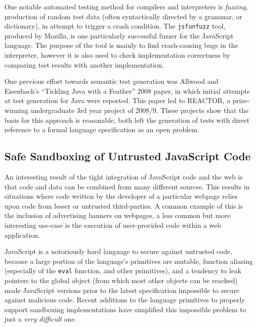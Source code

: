 \documentclass[a4paper]{article}
\begin{document}
One notable automated testing method for compilers and interpreters is
\emph{fuzzing}, production of random test data (often syntactically directed by
a grammar, or dictionary), in attempt to trigger a crash condition. The
\texttt{jsfunfuzz} tool, produced by Mozilla, is one particularly successful
fuzzer for the JavaScript language. The purpose of the tool is mainly to find
crash-causing bugs in the interpreter, however it is also used to check
implementation correctness by comparing test results with another implementation.

One previous effort towards semantic test generation was Allwood and Eisenbach's
``Tickling Java with a Feather'' 2008 paper, in which initial attempts at test
generation for Java were reported. This paper led to REACTOR, a prize-winning
undergraduate 3rd year project of 2008/9. These projects show that the basis for
this approach is reasonable, both left the generation of tests with direct
reference to a formal language specification as an open problem.

\subsection{Safe Sandboxing of Untrusted JavaScript Code}
An interesting result of the tight integration of JavaScript code and the web is
that code and data can be combined from many different sources. This results in
situations where code written by the developer of a particular webpage relies
upon code from lesser or untrusted third-parties. A common example of this is
the inclusion of advertising banners on webpages, a less common but more
interesting use-case is the execution of user-provided code within a web
application.

JavaScript is a notoriously hard language to secure against untrusted code,
because a large portion of the language's primitives are mutable, function aliasing
(especially of the \texttt{eval} function, and other primitives), and a tendency
to leak pointers to the global object (from which most other objects can be
reached) made JavaScript versions prior to the latest specification impossible
to secure against malicious code. Recent additions to the
language primitives to properly support sandboxing implementations have
simplified this impossible problem to just a \emph{very difficult} one.
\end{document}
